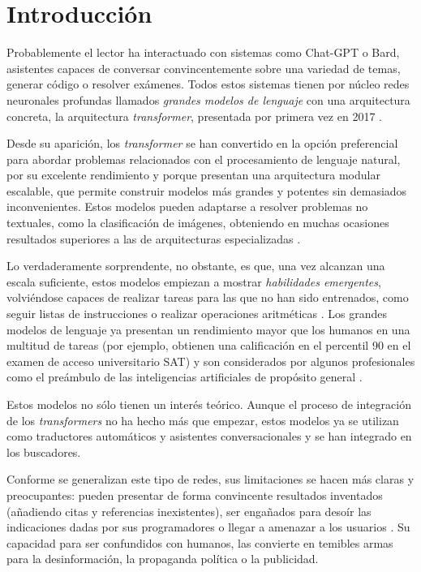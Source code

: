 \cleardoublepage

\chapter{Introducción}
Probablemente el lector ha interactuado con sistemas como Chat-GPT o Bard, asistentes capaces de conversar convincentemente sobre una variedad de temas, generar código o resolver exámenes. Todos estos sistemas tienen por núcleo redes neuronales profundas llamados \textit{grandes modelos de lenguaje} con una arquitectura concreta, la arquitectura \textit{transformer}, presentada por primera vez en 2017 \cite{vaswani2017attention}.

Desde su aparición, los \textit{transformer} se han convertido en la opción preferencial para abordar problemas relacionados con el procesamiento de lenguaje natural, por su excelente rendimiento y porque presentan una arquitectura modular escalable, que permite construir modelos más grandes y potentes sin demasiados inconvenientes. Estos modelos pueden adaptarse a resolver problemas no textuales, como la clasificación de imágenes, obteniendo en muchas ocasiones resultados superiores a las de arquitecturas especializadas \cite{dosovitskiy2020image}.

Lo verdaderamente sorprendente, no obstante, es que, una vez alcanzan una escala suficiente, estos modelos empiezan a mostrar \textit{habilidades emergentes}, volviéndose capaces de realizar tareas para las que no han sido entrenados, como seguir listas de instrucciones o realizar operaciones aritméticas \cite{wei2022emergent}. Los grandes modelos de lenguaje ya presentan un rendimiento mayor que los humanos en una multitud de tareas (por ejemplo, obtienen una calificación en el percentil 90 en el examen de acceso universitario SAT) y son considerados por algunos profesionales como el preámbulo de las inteligencias artificiales de propósito general \cite{bubeck2023sparks}.

Estos modelos no sólo tienen un interés teórico. Aunque el proceso de integración de los \textit{transformers} no ha hecho más que empezar, estos modelos ya se utilizan como traductores automáticos y asistentes conversacionales y se han integrado en los buscadores. 

Conforme se generalizan este tipo de redes, sus limitaciones se hacen más claras y preocupantes: pueden presentar de forma convincente resultados inventados (añadiendo citas y referencias inexistentes), ser engañados para desoír las indicaciones dadas por sus programadores o llegar a amenazar a los usuarios \cite{gpthallucination} \cite{gptthreats}. Su capacidad para ser confundidos con humanos, las convierte en temibles armas para la desinformación, la propaganda política o la publicidad. 

